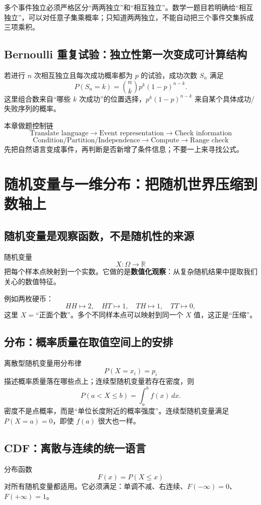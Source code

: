 \documentclass[11pt,a4paper,openany]{ctexbook}
\newcommand{\key}[1]{\textbf{\color{deep}#1}}
\begin{document}
多个事件独立必须严格区分“两两独立”和“相互独立”。数学一题目若明确给“相互独立”，可以对任意子集乘概率；只知道两两独立，不能自动把三个事件交集拆成三项乘积。

\section{Bernoulli 重复试验：独立性第一次变成可计算结构}
若进行 $n$ 次相互独立且每次成功概率都为 $p$ 的试验，成功次数 $S_n$ 满足
\[
P(S_n=k)=\binom nkp^k(1-p)^{n-k}.
\]
这里组合数来自“哪些 $k$ 次成功”的位置选择，$p^k(1-p)^{n-k}$ 来自某个具体成功/失败序列的概率。

\begin{methodbox}{本章做题控制链}
\[
\boxed{\text{Translate language}\to\text{Event representation}\to\text{Check information}}
\]
\[
\boxed{\text{Condition/Partition/Independence}\to\text{Compute}\to\text{Range check}}
\]
先把自然语言变成事件，再判断是否新增了条件信息；不要一上来寻找公式。
\end{methodbox}

\chapter{随机变量与一维分布：把随机世界压缩到数轴上}

\section{随机变量是观察函数，不是随机性的来源}
随机变量
\[
X:\Omega\to\mathbb R
\]
把每个样本点映射到一个实数。它做的是\key{数值化观察}：从复杂随机结果中提取我们关心的数值特征。

例如两枚硬币：
\[
HH\mapsto2,\quad HT\mapsto1,\quad TH\mapsto1,\quad TT\mapsto0,
\]
这里 $X=$“正面个数”。多个不同样本点可以映射到同一个 $X$ 值，这正是“压缩”。

\section{分布：概率质量在取值空间上的安排}
离散型随机变量用分布律
\[
P(X=x_i)=p_i
\]
描述概率质量落在哪些点上；连续型随机变量若存在密度，则
\[
P(a<X\le b)=\int_a^bf(x)\,dx.
\]
密度不是点概率，而是“单位长度附近的概率强度”。连续型随机变量满足 $P(X=a)=0$，即使 $f(a)$ 很大也一样。

\section{CDF：离散与连续的统一语言}
分布函数
\[
F(x)=P(X\le x)
\]
对所有随机变量都适用。它必须满足：单调不减、右连续、$F(-\infty)=0$、$F(+\infty)=1$。
\end{document}
